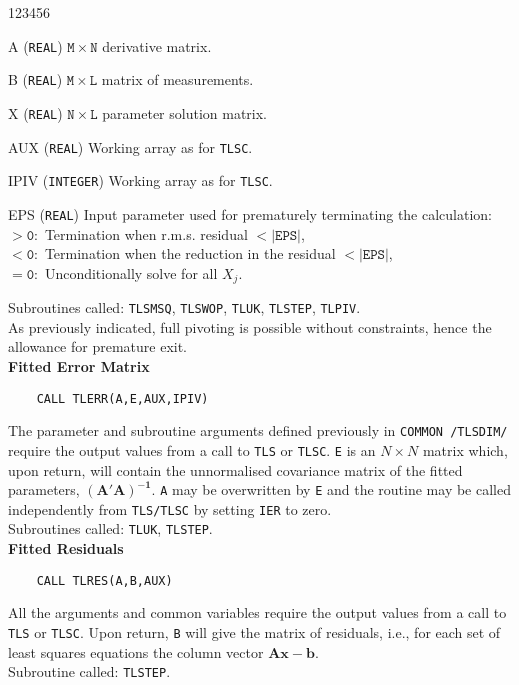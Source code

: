\begin{DLtt}{123456}
\item[A] ({\tt REAL}) $\mathtt{M \times N}$ derivative matrix.
\item[B] ({\tt REAL}) $\mathtt{M \times L}$ matrix of measurements.
\item[X] ({\tt REAL}) $\mathtt{N \times L}$ parameter solution matrix.
\item[AUX] ({\tt REAL}) Working array as for {\tt TLSC}.
\item[IPIV] ({\tt INTEGER}) Working array as for {\tt TLSC}.
\item[EPS] ({\tt REAL}) Input parameter used for prematurely
terminating the calculation: \\
$\mathtt{> 0:}$ Termination when r.m.s. residual $\mathtt{<|EPS|}$,\\
$\mathtt{< 0:}$ Termination when the reduction in the residual
$\mathtt{<|EPS|}$, \\
$\mathtt{= 0:}$ Unconditionally solve for all $X_j.$
\end{DLtt}
Subroutines called: {\tt TLSMSQ}, {\tt TLSWOP}, {\tt TLUK},
{\tt TLSTEP}, {\tt TLPIV}.\\[3mm]
As previously indicated, full pivoting is possible
without constraints, hence the allowance for premature exit.\\[3mm]
{\bf  Fitted Error Matrix}
\begin{verbatim}
    CALL TLERR(A,E,AUX,IPIV)
\end{verbatim}
The parameter and subroutine arguments defined previously in
{\tt COMMON /TLSDIM/} require the output values from a call to
{\tt TLS} or {\tt TLSC}. {\tt E} is an $N \times N$ matrix
which, upon return, will contain the unnormalised covariance matrix of
the fitted parameters, $\mathbf{(A'A)^{-1}}$. {\tt A} may be overwritten
by {\tt E} and the routine may be called independently from
{\tt TLS/TLSC} by  setting {\tt IER} to zero. \\[3mm]
Subroutines called: {\tt TLUK}, {\tt TLSTEP}.\\[3mm]
{\bf Fitted Residuals}
\begin{verbatim}
    CALL TLRES(A,B,AUX)
\end{verbatim}
All the arguments and common variables require the output
values from a call to {\tt TLS} or {\tt TLSC}. Upon return,
{\tt B} will give the matrix of residuals, i.e., for each set of
least squares equations the column vector $\mathbf{Ax-b}$.\\[3mm]
Subroutine called: {\tt TLSTEP}.
